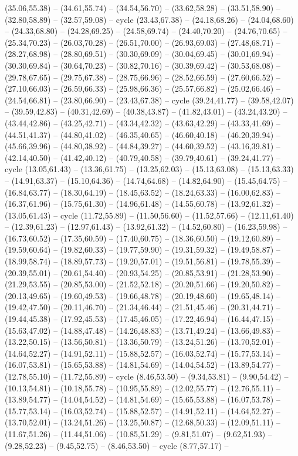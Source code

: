 {(35.06,55.38) -- (34.61,55.74) -- (34.54,56.70) -- (33.62,58.28) -- (33.51,58.90) -- (32.80,58.89) -- (32.57,59.08) -- cycle (23.43,67.38) -- (24.18,68.26) -- (24.04,68.60) -- (24.33,68.80) -- (24.28,69.25) -- (24.58,69.74) -- (24.40,70.20) -- (24.76,70.65) -- (25.34,70.23) -- (26.03,70.28) -- (26.51,70.00) -- (26.93,69.03) -- (27.48,68.71) -- (28.27,68.98) -- (28.80,69.51) -- (30.30,69.09) -- (30.04,69.45) -- (30.01,69.94) -- (30.30,69.84) -- (30.64,70.23) -- (30.82,70.16) -- (30.39,69.42) -- (30.53,68.08) -- (29.78,67.65) -- (29.75,67.38) -- (28.75,66.96) -- (28.52,66.59) -- (27.60,66.52) -- (27.10,66.03) -- (26.59,66.33) -- (25.98,66.36) -- (25.57,66.82) -- (25.02,66.46) -- (24.54,66.81) -- (23.80,66.90) -- (23.43,67.38) -- cycle (39.24,41.77) -- (39.58,42.07) -- (39.59,42.83) -- (40.31,42.69) -- (40.38,43.87) -- (41.82,43.01) -- (43.24,43.20) -- (43.44,42.86) -- (43.25,42.71) -- (43.34,42.32) -- (43.63,42.29) -- (43.33,41.69) -- (44.51,41.37) -- (44.80,41.02) -- (46.35,40.65) -- (46.60,40.18) -- (46.20,39.94) -- (45.66,39.96) -- (44.80,38.92) -- (44.84,39.27) -- (44.60,39.52) -- (43.16,39.81) -- (42.14,40.50) -- (41.42,40.12) -- (40.79,40.58) -- (39.79,40.61) -- (39.24,41.77) -- cycle (13.05,61.43) -- (13.36,61.75) -- (13.25,62.03) -- (15.13,63.08) -- (15.13,63.33) -- (14.91,63.37) -- (15.10,64.36) -- (14.74,64.68) -- (14.82,64.90) -- (15.45,64.75) -- (16.84,63.77) -- (18.30,64.19) -- (18.45,63.52) -- (18.24,63.33) -- (16.00,62.83) -- (16.37,61.96) -- (15.75,61.30) -- (14.96,61.48) -- (14.55,60.78) -- (13.92,61.32) -- (13.05,61.43) -- cycle (11.72,55.89) -- (11.50,56.60) -- (11.52,57.66) -- (12.11,61.40) -- (12.39,61.23) -- (12.97,61.43) -- (13.92,61.32) -- (14.52,60.80) -- (16.23,59.98) -- (16.73,60.52) -- (17.35,60.59) -- (17.40,60.75) -- (18.36,60.50) -- (19.12,60.89) -- (19.59,60.64) -- (19.82,60.33) -- (19.77,59.90) -- (19.31,59.32) -- (19.49,58.87) -- (18.99,58.74) -- (18.89,57.73) -- (19.20,57.01) -- (19.51,56.81) -- (19.78,55.39) -- (20.39,55.01) -- (20.61,54.40) -- (20.93,54.25) -- (20.85,53.91) -- (21.28,53.90) -- (21.29,53.55) -- (20.85,53.00) -- (21.52,52.18) -- (20.20,51.66) -- (19.20,50.82) -- (20.13,49.65) -- (19.60,49.53) -- (19.66,48.78) -- (20.19,48.60) -- (19.65,48.14) -- (19.42,47.50) -- (20.11,46.70) -- (21.34,46.44) -- (21.51,45.46) -- (20.31,44.71) -- (19.44,45.38) -- (17.92,45.53) -- (17.45,46.05) -- (17.22,46.94) -- (16.44,47.15) -- (15.63,47.02) -- (14.88,47.48) -- (14.26,48.83) -- (13.71,49.24) -- (13.66,49.83) -- (13.22,50.15) -- (13.56,50.81) -- (13.36,50.79) -- (13.24,51.26) -- (13.70,52.01) -- (14.64,52.27) -- (14.91,52.11) -- (15.88,52.57) -- (16.03,52.74) -- (15.77,53.14) -- (16.07,53.81) -- (15.65,53.88) -- (14.81,54.69) -- (14.04,54.52) -- (13.89,54.77) -- (12.78,55.10) -- (11.72,55.89) -- cycle (8.46,53.50) -- (9.34,53.81) -- (9.90,54.42) -- (10.13,54.81) -- (10.18,55.78) -- (10.95,55.89) -- (12.02,55.77) -- (12.76,55.11) -- (13.89,54.77) -- (14.04,54.52) -- (14.81,54.69) -- (15.65,53.88) -- (16.07,53.78) -- (15.77,53.14) -- (16.03,52.74) -- (15.88,52.57) -- (14.91,52.11) -- (14.64,52.27) -- (13.70,52.01) -- (13.24,51.26) -- (13.25,50.87) -- (12.68,50.33) -- (12.09,51.11) -- (11.67,51.26) -- (11.44,51.06) -- (10.85,51.29) -- (9.81,51.07) -- (9.62,51.93) -- (9.28,52.23) -- (9.45,52.75) -- (8.46,53.50) -- cycle (8.77,57.17) -- }
